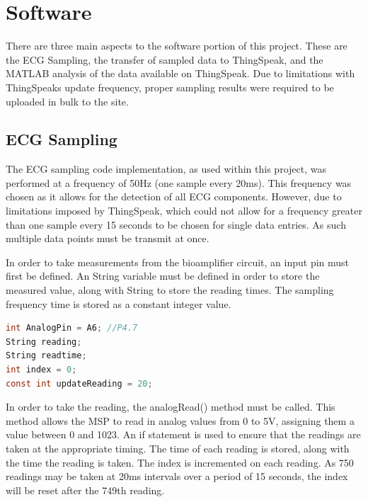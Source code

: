 \documentclass[11pt,a4paper,headinclude=false,footinclude=false]{scrreprt}
\begin{document}
\hypertarget{software}{%
\chapter{Software}\label{software}}

There are three main aspects to the software portion of this project.
These are the ECG Sampling, the transfer of sampled data to ThingSpeak,
and the MATLAB analysis of the data available on ThingSpeak. Due to
limitations with ThingSpeaks update frequency, proper sampling results
were required to be uploaded in bulk to the site.

\hypertarget{ecg-sampling}{%
\section{ECG Sampling}\label{ecg-sampling}}

The ECG sampling code implementation, as used within this project, was
performed at a frequency of 50Hz (one sample every 20ms). This frequency
was chosen as it allows for the detection of all ECG
components\cite{biopacl5}. However, due to limitations imposed by
ThingSpeak, which could not allow for a frequency greater than one
sample every 15 seconds to be chosen for single data entries. As such
multiple data points must be transmit at once.

In order to take measurements from the bioamplifier circuit, an input
pin must first be defined. An String variable must be defined in order
to store the measured value, along with String to store the reading
times. The sampling frequency time is stored as a constant integer
value.

\lstset{
    caption=Analog Input Pin Definition,
    basicstyle=\footnotesize, frame=tb,
    xleftmargin=.2\textwidth, xrightmargin=.2\textwidth
}
\begin{lstlisting}[language=C]
int AnalogPin = A6; //P4.7
String reading;
String readtime;
int index = 0;
const int updateReading = 20;
\end{lstlisting}

In order to take the reading, the analogRead() method must be called.
This method allows the MSP to read in analog values from 0 to 5V,
assigning them a value between 0 and 1023. An if statement is used to
ensure that the readings are taken at the appropriate timing. The time
of each reading is stored, along with the time the reading is taken. The
index is incremented on each reading. As 750 readings may be taken at
20ms intervals over a period of 15 seconds, the index will be reset
after the 749th reading.
\end{document}
